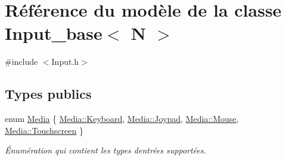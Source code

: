 \hypertarget{class_input__base}{}\section{Référence du modèle de la classe Input\+\_\+base$<$ N $>$}
\label{class_input__base}


{\ttfamily \#include $<$Input.\+h$>$}

\subsection*{Types publics}
\begin{DoxyCompactItemize}
\item 
enum \hyperlink{class_input__base_a455585e7933485981b3d7bfcad3a47c6}{Media} \{ \hyperlink{class_input__base_a455585e7933485981b3d7bfcad3a47c6a6ce4d85a628a88bbdb3ac24a8e5a9c2e}{Media\+::\+Keyboard}, 
\hyperlink{class_input__base_a455585e7933485981b3d7bfcad3a47c6ad17c22e217179fc5626be9b94f1f18fa}{Media\+::\+Joypad}, 
\hyperlink{class_input__base_a455585e7933485981b3d7bfcad3a47c6af2a47c6809d88e175dade0ef7b16aa13}{Media\+::\+Mouse}, 
\hyperlink{class_input__base_a455585e7933485981b3d7bfcad3a47c6a588711541a203a16bbc517f3f73ef7c8}{Media\+::\+Touchscreen}
 \}\begin{DoxyCompactList}\small\item\em Énumération qui contient les types d\textquotesingle{}entrées supportées. \end{DoxyCompactList}
\end{DoxyCompactItemize}
